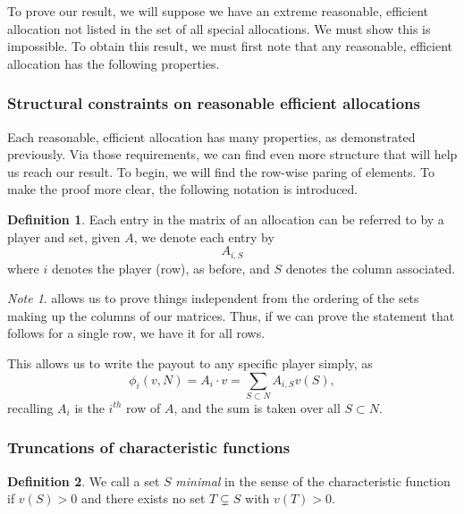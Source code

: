 \documentclass[12pt,letterpaper,final]{article}
\theoremstyle{plain}
\theoremstyle{plain}
\theoremstyle{plain}
\theoremstyle{plain}
\theoremstyle{plain}
\theoremstyle{plain}
\theoremstyle{plain}
\theoremstyle{definition}
\newtheorem{definition}{Definition}[section]
\theoremstyle{definition}
\theoremstyle{definition}
\theoremstyle{definition}
\theoremstyle{definition}
\theoremstyle{remark}
\theoremstyle{remark}
\newtheorem*{note}{Note}
\theoremstyle{remark}
\theoremstyle{remark}
\begin{document}
To prove our result, we will suppose we have an extreme reasonable,
efficient allocation not
listed in the set of all special allocations. We 
must show this is impossible. To obtain this result, we must first
note that 
any reasonable, efficient allocation has the following properties.

\subsubsection{Structural constraints on reasonable efficient allocations}

Each reasonable, efficient allocation has many properties, as
demonstrated previously. Via those requirements, we
can find even 
more structure that will help us reach our result. To begin, we
will find the row-wise paring of elements. To make the proof more clear, the
following notation is introduced. 

\begin{definition}\label{def:matrixEntries} 
  Each entry in the matrix of an allocation can be referred
  to by a player and set, given \(A\),  we denote each entry by
  \[
    A_{i,S}
  \]
  where \(i\) denotes the player (row), as before, and \(S\) denotes
  the column associated.
\end{definition}

\begin{note}
   allows us to prove things
  independent from the ordering of the sets making up the columns of
  our matrices. Thus, if we can prove the statement that follows for a
  single row, we have it for all rows.
\end{note}

This allows us to write the payout to any specific player simply, as
\[
  \phi_i(v,N) = A_i\cdot v = \sum_{S\subset N} A_{i,S}v(S),
\]
recalling \(A_i\) is the \(i^{th}\) row of \(A\), and the sum is taken
over all \(S\subset N\).  

\subsubsection{Truncations of characteristic functions}

\begin{definition}
  We call a set \(S\) \emph{minimal} in the sense of the characteristic
  function if
  \(v(S)>0\) and there exists no set \(T \subsetneq S\) with
  \(v(T)>0\).
\end{definition}
\end{document}
